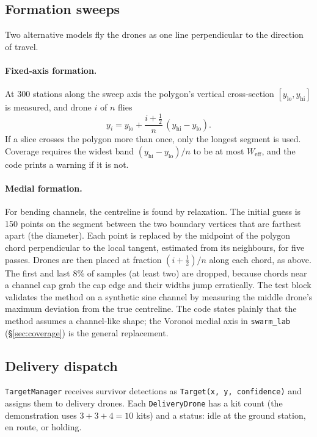 \documentclass[11pt,a4paper]{article}
\newcommand{\code}[1]{\texttt{#1}}
\begin{document}
\subsection{Formation sweeps}

Two alternative models fly the drones as one line perpendicular to the direction of travel.

\paragraph{Fixed-axis formation.} At 300 stations along the sweep axis the polygon's vertical cross-section
$[y_{\text{lo}},y_{\text{hi}}]$ is measured, and drone $i$ of $n$ flies
\begin{equation}
y_i = y_{\text{lo}} + \frac{i+\tfrac12}{n}\,(y_{\text{hi}}-y_{\text{lo}}).
\end{equation}
If a slice crosses the polygon more than once, only the longest segment is used. Coverage requires the
widest band $(y_{\text{hi}}-y_{\text{lo}})/n$ to be at most $W_{\text{eff}}$, and the code prints a warning
if it is not.

\paragraph{Medial formation.} For bending channels, the centreline is found by relaxation. The initial
guess is 150 points on the segment between the two boundary vertices that are farthest apart (the
diameter). Each point is replaced by the midpoint of the polygon chord perpendicular to the local tangent,
estimated from its neighbours, for five passes. Drones are then placed at fraction $(i+\tfrac12)/n$ along
each chord, as above. The first and last 8\% of samples (at least two) are dropped, because chords near a
channel cap grab the cap edge and their widths jump erratically. The test block validates the method on a
synthetic sine channel by measuring the middle drone's maximum deviation from the true centreline. The code
states plainly that the method assumes a channel-like shape; the Voronoi medial axis in
\code{swarm\_lab} (\S\ref{sec:coverage}) is the general replacement.

\subsection{Delivery dispatch}

\code{TargetManager} receives survivor detections as \code{Target(x, y, confidence)} and assigns them to
delivery drones. Each \code{DeliveryDrone} has a kit count (the demonstration uses $3+3+4=10$ kits) and a
status: idle at the ground station, en route, or holding.
\end{document}
